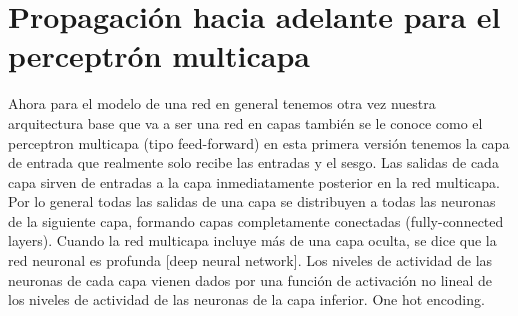 \section{Propagación hacia adelante para el perceptrón multicapa}

Ahora para el modelo de una red en general tenemos otra vez nuestra arquitectura base que va a ser una red en capas también se le conoce como el perceptron multicapa (tipo feed-forward) en esta primera versión tenemos la capa de entrada que realmente solo recibe las entradas y el sesgo. Las salidas de cada capa sirven de entradas a la capa inmediatamente posterior en la red multicapa. Por lo general todas las salidas de una capa se distribuyen a todas las neuronas de la siguiente capa, formando capas completamente conectadas (fully-connected layers).
Cuando la red multicapa incluye más de una capa oculta, se dice que la red neuronal es profunda [deep neural network].
Los niveles de actividad de las neuronas de cada capa vienen dados por una función de activación no lineal de los niveles de actividad de las neuronas de la capa inferior.
One hot encoding.

